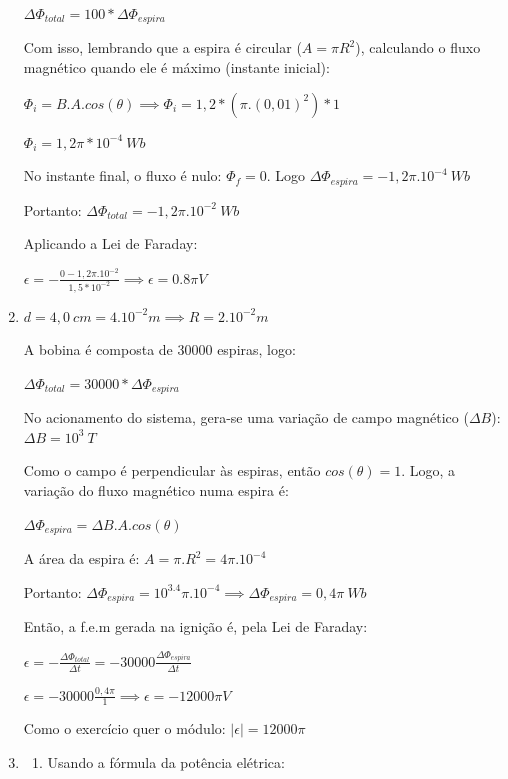 \documentclass[12pt,letterpaper,fleqn]{article}
\begin{document}
\begin{enumerate}
        $\Delta \Phi_{total} = 100*\Delta \Phi_{espira}$
        
        Com isso, lembrando que a espira é circular ($A=\pi R^2$), calculando o fluxo magnético quando ele é máximo (instante inicial):
        
        $\Phi_i = B.A.cos(\theta) \implies \Phi_i = 1,2*(\pi.(0,01)^2)*1$
        
        $\Phi_i = 1,2\pi*10^{-4} \: Wb$
        
        No instante final, o fluxo é nulo: $\Phi_f = 0$. Logo $\Delta \Phi_{espira} = -1,2\pi .10^{-4} \: Wb$
        
        Portanto: $\Delta \Phi_{total} = -1,2\pi . 10^{-2} \: Wb$
        
        Aplicando a Lei de Faraday:
        
        $\epsilon = - \frac{0 - 1,2\pi.10^{-2}}{1,5*10^{-2}} \implies \epsilon = 0.8\pi V$
        
        \item $d = 4,0 \: cm = 4.10^{-2} m \implies R = 2.10^{-2} m$
        
        A bobina é composta de 30000 espiras, logo:
        
        $\Delta \Phi_{total} = 30000*\Delta \Phi_{espira}$
        
        No acionamento do sistema, gera-se uma variação de campo magnético ($\Delta B$): $\Delta B = 10^3 \: T$
        
        Como o campo é perpendicular às espiras, então $cos(\theta) = 1$. Logo, a variação do fluxo magnético numa espira é:
        
        $\Delta \Phi_{espira} = \Delta B .A.cos(\theta)$
        
        A área da espira é: $A = \pi.R^2 = 4\pi.10^{-4}$
        
        Portanto: $\Delta \Phi_{espira} = 10^3.4\pi.10^{-4} \implies \Delta \Phi_{espira} = 0,4\pi \: Wb$
        
        Então, a f.e.m gerada na ignição é, pela Lei de Faraday:
        
        $\epsilon = - \frac{\Delta \Phi_{total}}{\Delta t} = - 30000 \frac{\Delta \Phi_{espira}}{\Delta t}$
        
        $\epsilon =  - 30000 \frac{0,4\pi}{1} \implies \epsilon = -12000\pi V$
        
        Como o exercício quer o módulo: $|\epsilon| = 12000\pi$
        
        \item
        \begin{enumerate}
            \item Usando a fórmula da potência elétrica:
            

\end{enumerate}
\end{enumerate}
\end{document}
